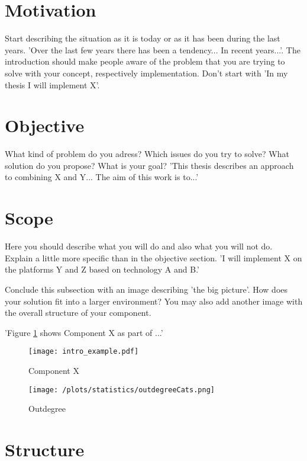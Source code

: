\section{Motivation\label{sec:moti}}

Start describing the situation as it is today or as it has been during the last years. 'Over the last few years there has been a tendency... In recent years...'. The introduction should make people aware of the problem that you are trying to solve with your concept, respectively implementation. Don't start with 'In my thesis I will implement X'.

\section{Objective\label{sec:objective}}

What kind of problem do you adress? Which issues do you try to solve? What solution do you propose? What is your goal?
'This thesis describes an approach to combining X and Y... The aim of this work is to...'

\section{Scope\label{sec:scope}}

Here you should describe what you will do and also what you will not do. Explain a little more specific than in the objective section. 'I will implement X on the platforms Y and Z based on technology A and B.'

Conclude this subsection with an image describing 'the big picture'. How does your solution fit into a larger environment? You may also add another image with the overall structure of your component.

'Figure \ref{fig:intro} shows Component X as part of ...' 
\\
\begin{figure}[htb]
  \centering
  \texttt{[image: intro\_example.pdf]}\\
  \caption{Component X}\label{fig:intro}
\end{figure}

\begin{figure}[htb]
  \centering
  \texttt{[image: /plots/statistics/outdegreeCats.png]}\\
  \caption{Outdegree}\label{fig:outdegree}
\end{figure}

\section{Structure\label{sec:outline}}

